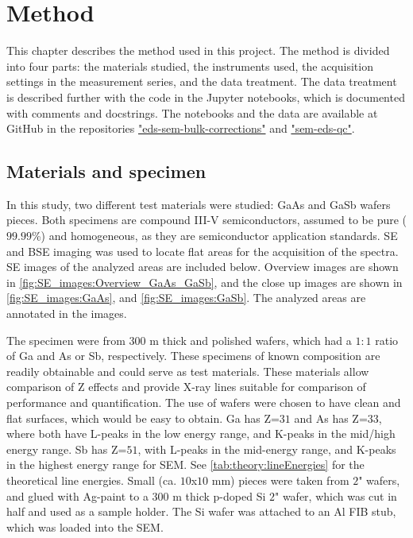 \chapter{Method}
\label{ch:method}

This chapter describes the method used in this project.
The method is divided into four parts: the materials studied, the instruments used, the acquisition settings in the measurement series, and the data treatment.
The data treatment is described further with the code in the Jupyter notebooks, which is documented with comments and docstrings.
The notebooks and the data are available at GitHub in the repositories \href{https://github.com/brynjarmorka/eds-sem-bulk-corrections}{"eds-sem-bulk-corrections"} and \href{https://github.com/brynjarmorka/sem-eds-qc}{"sem-eds-qc"}.





\section{Materials and specimen}
\label{method:materials}

In this study, two different test materials were studied: GaAs and GaSb wafers pieces.
Both specimens are compound III-V semiconductors, assumed to be pure ($99.99$\%) and homogeneous, as they are semiconductor application standards.
SE and BSE imaging was used to locate flat areas for the acquisition of the spectra.
SE images of the analyzed areas are included below.
Overview images are shown in \cref{fig:SE_images:Overview_GaAs_GaSb}, and the close up images are shown in \cref{fig:SE_images:GaAs}, and \cref{fig:SE_images:GaSb}. %
The analyzed areas are annotated in the images.


The specimen were from $300$ \textmu m thick and polished wafers, which had a $1:1$ ratio of Ga and As or Sb, respectively.
These specimens of known composition are readily obtainable and could serve as test materials.
These materials allow comparison of Z effects and provide X-ray lines suitable for comparison of performance and quantification.
The use of wafers were chosen to have clean and flat surfaces, which would be easy to obtain.
Ga has Z=$31$ and As has Z=$33$, where both have L-peaks in the low energy range, and K-peaks in the mid/high energy range.
Sb has Z=$51$, with L-peaks in the mid-energy range, and K-peaks in the highest energy range for SEM.
See \cref{tab:theory:lineEnergies} for the theoretical line energies.
Small (ca. $10$x$10$ mm) pieces were taken from $2$" wafers, and glued with Ag-paint to a $300$ \textmu m thick p-doped Si $2$" wafer, which was cut in half and used as a sample holder.
The Si wafer was attached to an Al FIB stub, which was loaded into the SEM.


